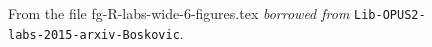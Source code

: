 \begin{figure}[t!]
\begin{minipage}{0.49\textwidth}
\end{minipage}
%
\caption[From the file fg-R-labs-wide-6-figures.tex]
{From the file fg-R-labs-wide-6-figures.tex {\em borrowed from} {\tt Lib-OPUS2-labs-2015-arxiv-Boskovic}. 
}
\label{fg-R-labs-wide-6-figures}
\end{figure}


